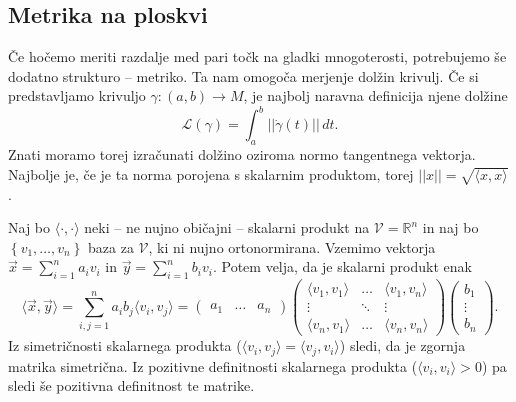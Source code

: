 \subsection{Metrika na ploskvi}%

Če hočemo meriti razdalje med pari točk na gladki
mnogoterosti, potrebujemo še dodatno strukturo --
metriko. Ta nam omogoča merjenje dolžin krivulj. Če si
predstavljamo krivuljo $\gamma : \left( a,b \right)
\to M$, je najbolj naravna definicija njene dolžine \begin{equation*}
\mathcal{L}\left( \gamma \right) = \int_{a}^{b}
\lvert\lvert \dot{\gamma } \left( t \right) \rvert\rvert
\, dt. \end{equation*}Znati moramo torej izračunati dolžino oziroma normo
tangentnega vektorja. Najbolje je, če je ta norma porojena s
skalarnim produktom, torej $\lvert\lvert x \rvert\rvert =
\sqrt{\langle x,x \rangle } $.

Naj bo $\langle \cdot , \cdot  \rangle $  neki -- ne nujno običajni -- skalarni
produkt na $\mathcal{V} = \mathbb{R}^n$ in naj bo $\left\{
v_1, \ldots , v_{n} \right\}$  baza za $\mathcal{V}$, ki ni
nujno ortonormirana. Vzemimo vektorja $\vec{x}  =
\sum_{i=1}^{n} a_{i}v_{i}$ in $\vec{y}  = \sum_{i=1}^{n}
b_{i}v_{i}.$ Potem velja, da je skalarni produkt enak \begin{equation*}
\langle \vec{x} , \vec{y} \rangle = \sum_{i,j = 1}^{n}
a_{i}b_{j}\langle v_{i}, v_{j} \rangle =
\begin{pmatrix}
a_1 & \ldots & a_n
\end{pmatrix}
\begin{pmatrix}
\langle v_1, v_1 \rangle & \dots & \langle v_1, v_n
\rangle \\ \vdots & \ddots & \vdots \\ \langle v_n,
v_1 \rangle & \dots & \langle v_n,v_n \rangle
\end{pmatrix}
\begin{pmatrix} b_1 \\ \vdots \\ b_n
\end{pmatrix}. \end{equation*}
Iz simetričnosti skalarnega produkta
($\langle v_{i}, v_{j} \rangle  = \langle v_{j},  v_{i}
\rangle $) sledi, da je zgornja matrika simetrična. Iz
pozitivne definitnosti skalarnega produkta ($\langle
v_{i}, v_{i} \rangle > 0$) pa sledi še pozitivna 
definitnost te matrike. 

